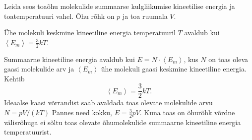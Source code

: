 
Leida seos toaõhu molekulide summaarse kulgliikumise kineetilise energia ja toatemperatuuri vahel. Õhu rõhk on $p$ ja toa ruumala $V$.

\hint
Ühe molekuli keskmine kineetiline energia temperatuuril $T$ avaldub kui $\left\langle E_{m}\right\rangle=\frac{3}{2} k T$.

\solu
Summaarne kineetiline energia avaldub kui $E = N \cdot \left\langle E_m\right\rangle$, kus $N$ on toas oleva gaasi molekulide arv ja $\left\langle E_m\right\rangle$ ühe molekuli gaasi keskmine kineetiline energia. Kehtib
\[
\left\langle E_{m}\right\rangle=\frac{3}{2} k T.
\]
Ideaalse kaasi võrrandist saab avaldada toas olevate molekulide arvu $N = pV /(kT)$ Pannes need kokku, $E = \frac{3}{2} pV$. Kuna toas on õhurõhk võrdne välisrõhuga ei sõltu toas olevate õhumolekulide summaarne kineetiline energia temperatuurist.
\probend